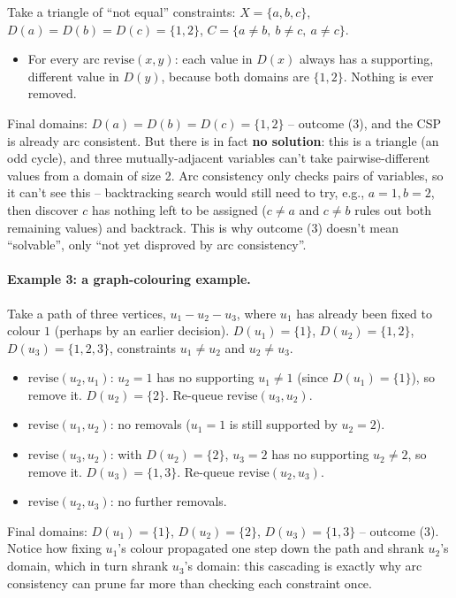 \documentclass[11pt]{article}
\begin{document}
Take a triangle of ``not equal'' constraints: $X=\{a,b,c\}$, $D(a)=D(b)=D(c)=\{1,2\}$, $C=\{a\neq b,\ b\neq c,\ a\neq c\}$.

\begin{itemize}
    \item For every arc $\mathrm{revise}(x,y)$: each value in $D(x)$ always has a supporting, different value in $D(y)$, because both domains are $\{1,2\}$. Nothing is ever removed.
\end{itemize}

Final domains: $D(a)=D(b)=D(c)=\{1,2\}$ -- outcome (3), and the CSP is already arc consistent. But there is in fact \textbf{no solution}: this is a triangle (an odd cycle), and three mutually-adjacent variables can't take pairwise-different values from a domain of size 2. Arc consistency only checks pairs of variables, so it can't see this -- backtracking search would still need to try, e.g., $a=1,b=2$, then discover $c$ has nothing left to be assigned ($c\neq a$ and $c\neq b$ rules out both remaining values) and backtrack. This is why outcome (3) doesn't mean ``solvable'', only ``not yet disproved by arc consistency''.

\paragraph{Example 3: a graph-colouring example.}

Take a path of three vertices, $u_1 - u_2 - u_3$, where $u_1$ has already been fixed to colour $1$ (perhaps by an earlier decision). $D(u_1)=\{1\}$, $D(u_2)=\{1,2\}$, $D(u_3)=\{1,2,3\}$, constraints $u_1\neq u_2$ and $u_2\neq u_3$.

\begin{itemize}
    \item $\mathrm{revise}(u_2,u_1)$: $u_2=1$ has no supporting $u_1\neq1$ (since $D(u_1)=\{1\}$), so remove it. $D(u_2)=\{2\}$. Re-queue $\mathrm{revise}(u_3,u_2)$.
    \item $\mathrm{revise}(u_1,u_2)$: no removals ($u_1=1$ is still supported by $u_2=2$).
    \item $\mathrm{revise}(u_3,u_2)$: with $D(u_2)=\{2\}$, $u_3=2$ has no supporting $u_2\neq2$, so remove it. $D(u_3)=\{1,3\}$. Re-queue $\mathrm{revise}(u_2,u_3)$.
    \item $\mathrm{revise}(u_2,u_3)$: no further removals.
\end{itemize}

Final domains: $D(u_1)=\{1\}$, $D(u_2)=\{2\}$, $D(u_3)=\{1,3\}$ -- outcome (3). Notice how fixing $u_1$'s colour propagated one step down the path and shrank $u_2$'s domain, which in turn shrank $u_3$'s domain: this cascading is exactly why arc consistency can prune far more than checking each constraint once.
\end{document}
